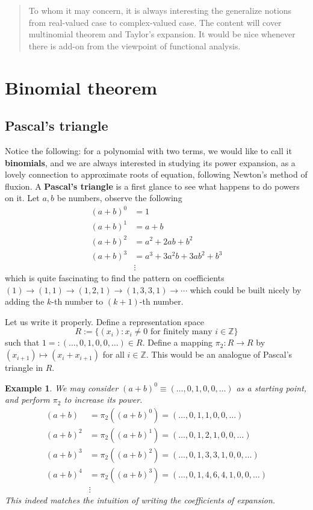 \documentclass[12pt]{article}
\newtheorem*{example}{Example}
\begin{document}
    \begin{abstract}
        To whom it may concern, it is always interesting the generalize notions from real-valued case to complex-valued case. The content will cover multinomial theorem and Taylor's expansion. It would be nice whenever there is add-on from the viewpoint of functional analysis.
    \end{abstract}

    \section{Binomial theorem}

    \subsection{Pascal's triangle}

    Notice the following: for a polynomial with two terms, we would like to call it \textbf{binomials}, and we are always interested in studying its power expansion, as a lovely connection to approximate roots of equation, following Newton's method of fluxion. A \textbf{Pascal's triangle} is a first glance to see what happens to do powers on it. Let $a,b$ be numbers, observe the following\begin{align*}
        (a+b)^0&=1\\
        (a+b)^1&=a+b\\
        (a+b)^2&=a^2+2ab+b^2\\
        (a+b)^3&=a^3+3a^2b+3ab^2+b^3\\
        &\vdots
    \end{align*}
    which is quite fascinating to find the pattern on coefficients $(1)\to(1,1)\to(1,2,1)\to(1,3,3,1)\to\cdots$ which could be built nicely by adding the $k$-th number to $(k+1)$-th number.

    Let us write it properly. Define a representation space \[R:=\{(x_i):x_i\neq 0\textrm{ for finitely many }i\in\mathbb{Z}\}\] such that $1=:(\dots,0,1,0,0,\dots)\in R$. Define a mapping $\pi_2:R\to R$ by $(x_{i+1})\mapsto (x_i+x_{i+1})$ for all $i\in\mathbb{Z}$. This would be an analogue of Pascal's triangle in $R$.

    \begin{example}
        We may consider $(a+b)^0\equiv(\dots,0,1,0,0,\dots)$ as a starting point, and perform $\pi_2$ to increase its power.\begin{align*}
            (a+b)&=\pi_2((a+b)^0)=(\dots,0,1,1,0,0,\dots)\\
            (a+b)^2&=\pi_2((a+b)^1)=(\dots,0,1,2,1,0,0,\dots)\\
            (a+b)^3&=\pi_2((a+b)^2)=(\dots,0,1,3,3,1,0,0,\dots)\\
            (a+b)^4&=\pi_2((a+b)^3)=(\dots,0,1,4,6,4,1,0,0,\dots)\\
            &\vdots
        \end{align*}
        This indeed matches the intuition of writing the coefficients of expansion.
    \end{example}
\end{document}
